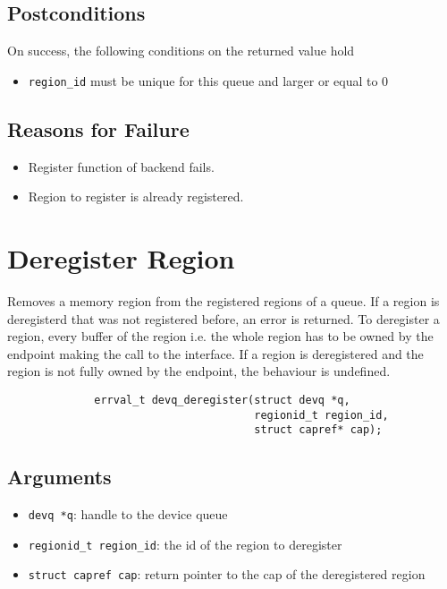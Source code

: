 \documentclass[a4paper,11pt,twoside]{report}
\begin{document}
	\subsection*{Postconditions}
	On success, the following conditions on the returned value hold
	\begin{itemize}
		\item \texttt{region\_id} must be unique for this queue and larger or equal to 0
	\end{itemize}
	
	\subsection*{Reasons for Failure}
	\begin{itemize}
		\item Register function of backend fails.
		\item Region to register is already registered.
	\end{itemize}
	
	\section{Deregister Region}
	Removes a memory region from the registered regions of a queue. 
	If a region is deregisterd that was not registered before, an error is returned. 
	To deregister a region, every buffer of the region i.e. the whole region has to be 
	owned by the endpoint making the call to the interface. If a region is deregistered and the 
	region is not fully owned by the endpoint, the behaviour is undefined.  
	\begin{figure}[h]
		\begin{lstlisting}
        errval_t devq_deregister(struct devq *q,
                                 regionid_t region_id,
                                 struct capref* cap);
		\end{lstlisting}
		\label{lst:deregister}
	\end{figure}
	
	\subsection*{Arguments}
	\begin{itemize}
		\item \texttt{devq *q}: handle to the device queue
		\item \texttt{regionid\_t region\_id}: the id of the region to deregister
		\item \texttt{struct capref cap}: return pointer to the cap of the deregistered region
	\end{itemize}
	
\end{document}
